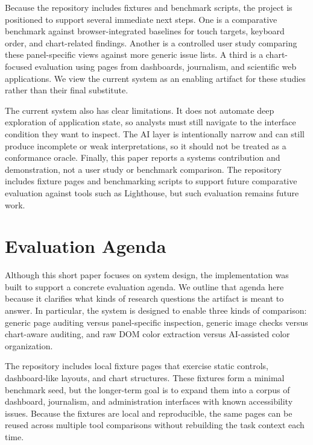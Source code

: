 Because the repository includes fixtures and benchmark scripts, the project is positioned to support several immediate next steps. One is a comparative benchmark against browser-integrated baselines for touch targets, keyboard order, and chart-related findings. Another is a controlled user study comparing these panel-specific views against more generic issue lists. A third is a chart-focused evaluation using pages from dashboards, journalism, and scientific web applications. We view the current system as an enabling artifact for these studies rather than their final substitute.

The current system also has clear limitations. It does not automate deep exploration of application state, so analysts must still navigate to the interface condition they want to inspect. The AI layer is intentionally narrow and can still produce incomplete or weak interpretations, so it should not be treated as a conformance oracle. Finally, this paper reports a systems contribution and demonstration, not a user study or benchmark comparison. The repository includes fixture pages and benchmarking scripts to support future comparative evaluation against tools such as Lighthouse, but such evaluation remains future work.

\section{Evaluation Agenda}
\label{sec:evaluation}

Although this short paper focuses on system design, the implementation was built to support a concrete evaluation agenda. We outline that agenda here because it clarifies what kinds of research questions the artifact is meant to answer. In particular, the system is designed to enable three kinds of comparison: generic page auditing versus panel-specific inspection, generic image checks versus chart-aware auditing, and raw DOM color extraction versus AI-assisted color organization.

The repository includes local fixture pages that exercise static controls, dashboard-like layouts, and chart structures. These fixtures form a minimal benchmark seed, but the longer-term goal is to expand them into a corpus of dashboard, journalism, and administration interfaces with known accessibility issues. Because the fixtures are local and reproducible, the same pages can be reused across multiple tool comparisons without rebuilding the task context each time.

